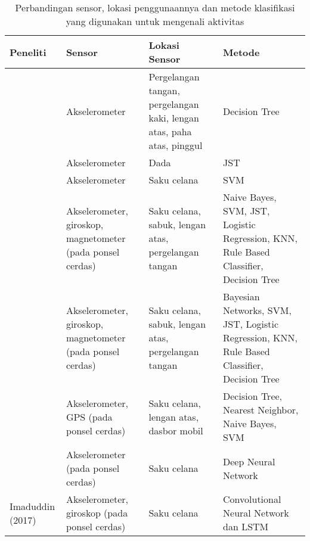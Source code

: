 \begin{table}[p!]
    \centering
    \caption{Perbandingan sensor, lokasi penggunaannya dan metode klasifikasi yang digunakan untuk mengenali aktivitas}
    \begin{tabular}{ |L{2cm}|L{3cm}|L{4.2cm}|L{3cm}| }
        \hline
        \textbf{Peneliti} & \textbf{Sensor} & \textbf{Lokasi Sensor} & \textbf{Metode} \\

        \hline
        \citet{tapia-2007} & Akselerometer & Pergelangan tangan, pergelangan kaki, lengan atas, paha atas, pinggul & Decision Tree \\

        \hline
        \citet{khan-2010} & Akselerometer & Dada & JST \\

        \hline
        \citet{he-2008} & Akselerometer & Saku celana & SVM \\

        \hline
        \citet{shoaib-2013} & Akselerometer, giroskop, magnetometer (pada ponsel cerdas) & Saku celana, sabuk, lengan atas, pergelangan tangan & Naive Bayes, SVM, JST, Logistic Regression, KNN, Rule Based Classifier, Decision Tree \\

        \hline
        \citet{shoaib-2014} & Akselerometer, giroskop, magnetometer (pada ponsel cerdas) & Saku celana, sabuk, lengan atas, pergelangan tangan & Bayesian Networks, SVM, JST, Logistic Regression, KNN, Rule Based Classifier, Decision Tree \\

        \hline
        \citet{Chiang-201413} & Akselerometer, GPS (pada ponsel cerdas) & Saku celana, lengan atas, dasbor mobil & Decision Tree, Nearest Neighbor, Naive Bayes, SVM \\

        \hline
        \citet{zhang-2015} & Akselerometer (pada ponsel cerdas) & Saku celana & Deep Neural Network \\

        \hline
        Imaduddin (2017) & Akselerometer, giroskop (pada ponsel cerdas) & Saku celana & Convolutional Neural Network dan LSTM \\

        \hline
    \end{tabular}
    \label{table:perbandingan-pustaka}
\end{table}
